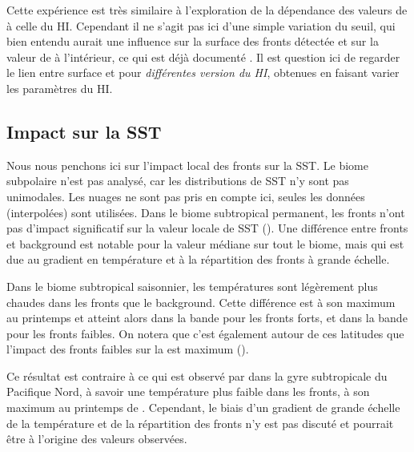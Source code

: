 \begin{note}
  Cette expérience est très similaire à l'exploration de la dépendance des valeurs de  à celle du HI.
  Cependant il ne s'agit pas ici d'une simple variation du seuil, qui bien entendu aurait une influence sur la surface des fronts détectée et sur la valeur de  à l'intérieur, ce qui est déjà documenté .
  Il est question ici de regarder le lien entre surface et  pour \emph{différentes version du HI}, obtenues en faisant varier les paramètres du HI.
\end{note}

\subsection{Impact sur la SST}
\label{sec:res-sst}

Nous nous penchons ici sur l'impact local des fronts sur la SST.
Le biome subpolaire n'est pas analysé, car les distributions de SST n'y sont pas unimodales.
Les nuages ne sont pas pris en compte ici, seules les données  (interpolées) sont utilisées.
Dans le biome subtropical permanent, les fronts n'ont pas d'impact significatif sur la valeur locale de SST ().
Une différence entre fronts et background est notable pour la valeur médiane sur tout le biome, mais qui est due au gradient en température et à la répartition des fronts à grande échelle.

\begin{figure}
  \centering
  \label{fig:ts-cli-sst}
\end{figure}

Dans le biome subtropical saisonnier, les températures sont légèrement plus chaudes dans les fronts que le background.
Cette différence est à son maximum au printemps et atteint alors  dans la bande  pour les fronts forts, et  dans la bande  pour les fronts faibles.
On notera que c'est également autour de ces latitudes que l'impact des fronts faibles sur la  est maximum ().

Ce résultat est contraire à ce qui est observé par \textcite{liu_2016} dans la gyre subtropicale du Pacifique Nord, à savoir une température plus faible dans les fronts, à son maximum au printemps de .
Cependant, le biais d'un gradient de grande échelle de la température et de la répartition des fronts n'y est pas discuté et pourrait être à l'origine des valeurs observées.
